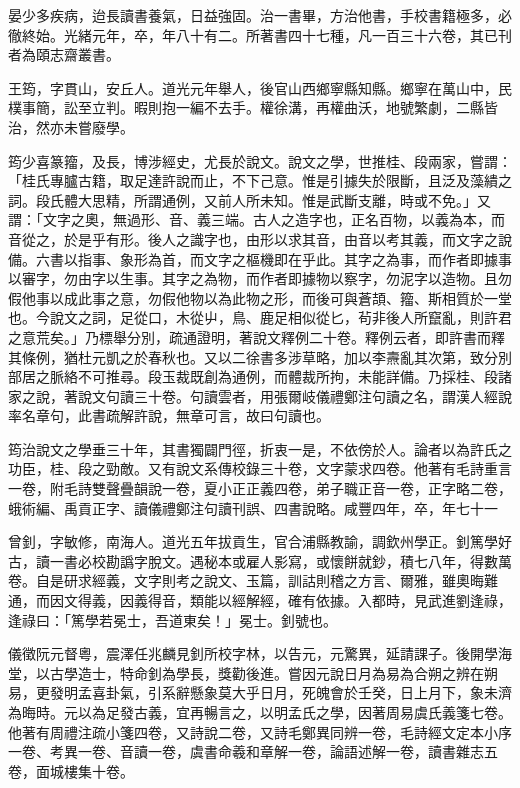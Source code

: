 \begin{pinyinscope}
晏少多疾病，迨長讀書養氣，日益強固。治一書畢，方治他書，手校書籍極多，必徹終始。光緒元年，卒，年八十有二。所著書四十七種，凡一百三十六卷，其已刊者為頤志齋叢書。

王筠，字貫山，安丘人。道光元年舉人，後官山西鄉寧縣知縣。鄉寧在萬山中，民樸事簡，訟至立判。暇則抱一編不去手。權徐溝，再權曲沃，地號繁劇，二縣皆治，然亦未嘗廢學。

筠少喜篆籀，及長，博涉經史，尤長於說文。說文之學，世推桂、段兩家，嘗謂：「桂氏專臚古籍，取足達許說而止，不下己意。惟是引據失於限斷，且泛及藻繢之詞。段氏體大思精，所謂通例，又前人所未知。惟是武斷支離，時或不免。」又謂：「文字之奧，無過形、音、義三端。古人之造字也，正名百物，以義為本，而音從之，於是乎有形。後人之識字也，由形以求其音，由音以考其義，而文字之說備。六書以指事、象形為首，而文字之樞機即在乎此。其字之為事，而作者即據事以審字，勿由字以生事。其字之為物，而作者即據物以察字，勿泥字以造物。且勿假他事以成此事之意，勿假他物以為此物之形，而後可與蒼頡、籀、斯相質於一堂也。今說文之詞，足從口，木從屮，鳥、鹿足相似從匕，茍非後人所竄亂，則許君之意荒矣。」乃標舉分別，疏通證明，著說文釋例二十卷。釋例云者，即許書而釋其條例，猶杜元凱之於春秋也。又以二徐書多涉草略，加以李燾亂其次第，致分別部居之脈絡不可推尋。段玉裁既創為通例，而體裁所拘，未能詳備。乃採桂、段諸家之說，著說文句讀三十卷。句讀雲者，用張爾岐儀禮鄭注句讀之名，謂漢人經說率名章句，此書疏解許說，無章可言，故曰句讀也。

筠治說文之學垂三十年，其書獨闢門徑，折衷一是，不依傍於人。論者以為許氏之功臣，桂、段之勁敵。又有說文系傳校錄三十卷，文字蒙求四卷。他著有毛詩重言一卷，附毛詩雙聲疊韻說一卷，夏小正正義四卷，弟子職正音一卷，正字略二卷，蛾術編、禹貢正字、讀儀禮鄭注句讀刊誤、四書說略。咸豐四年，卒，年七十一

曾釗，字敏修，南海人。道光五年拔貢生，官合浦縣教諭，調欽州學正。釗篤學好古，讀一書必校勘譌字脫文。遇秘本或雇人影寫，或懷餅就鈔，積七八年，得數萬卷。自是研求經義，文字則考之說文、玉篇，訓詁則稽之方言、爾雅，雖奧晦難通，而因文得義，因義得音，類能以經解經，確有依據。入都時，見武進劉逢祿，逢祿曰：「篤學若冕士，吾道東矣！」冕士。釗號也。

儀徵阮元督粵，震澤任兆麟見釗所校字林，以告元，元驚異，延請課子。後開學海堂，以古學造士，特命釗為學長，獎勸後進。嘗因元說日月為易為合朔之辨在朔易，更發明孟喜卦氣，引系辭懸象莫大乎日月，死魄會於壬癸，日上月下，象未濟為晦時。元以為足發古義，宜再暢言之，以明孟氏之學，因著周易虞氏義箋七卷。他著有周禮注疏小箋四卷，又詩說二卷，又詩毛鄭異同辨一卷，毛詩經文定本小序一卷、考異一卷、音讀一卷，虞書命羲和章解一卷，論語述解一卷，讀書雜志五卷，面城樓集十卷。


\end{pinyinscope}
